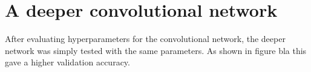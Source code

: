 \section{A deeper convolutional network}
After evaluating hyperparameters for the convolutional network, the deeper network was simply tested with the same parameters. As shown in figure bla   this gave a higher validation accuracy.


